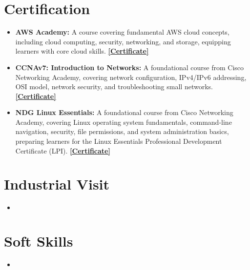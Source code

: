 \documentclass[letterpaper,11pt]{article}
\newcommand{\resumeItem}[1]{
  \item\small{
	{#1 \vspace{-2pt}}
  }
}
\newcommand{\resumeItemListStart}{\begin{itemize}}
\newcommand{\resumeItemListEnd}{\end{itemize}\vspace{-5pt}}
\begin{document}
\section{Certification}
 \begin{itemize}[leftmargin=0.15in, label={}]
            \resumeItemListStart
            \resumeItem{\textbf{AWS Academy: }A course covering fundamental AWS cloud concepts, including cloud computing, security, networking, and storage, equipping learners with core cloud skills. \href{https://drive.google.com/file/d/1iq0E8CPSki_hJY7ClYT2_6qWJkMkrkgf/view?usp=sharing}{\textbf{[Certificate]}}}
            \resumeItem{\textbf{CCNAv7: Introduction to Networks: }A foundational course from Cisco Networking Academy, covering network configuration, IPv4/IPv6 addressing, OSI model, network security, and troubleshooting small networks. \href{https://drive.google.com/file/d/1_IEyxBQWN65uI_czhONt5LY9QOETupq1/view?usp=sharing}{\textbf{[Certificate]}}}
            \resumeItem{\textbf{NDG Linux Essentials: }A foundational course from Cisco Networking Academy, covering Linux operating system fundamentals, command-line navigation, security, file permissions, and system administration basics, preparing learners for the Linux Essentials Professional Development Certificate (LPI). \href{https://drive.google.com/file/d/1K7rsGVzupwHV1LGXMnYStDb6bkIqka6a/view?usp=sharing}{\textbf{[Certificate]}}}
            \resumeItemListEnd
 \end{itemize}
\section{Industrial Visit}
 \begin{itemize}[leftmargin=0.15in, label={}]
	\resumeItemListStart
            \resumeItem{\textbf{EinfoChip }- Ahmedabad}
    	\resumeItem{\textbf{Antier }- Chandigarh}
  	\resumeItemListEnd
            \resumeItem{}
 \end{itemize}

\section{Soft Skills}
\begin{itemize}[leftmargin=0.15in, label={}]
	\resumeItemListStart
            \resumeItem{Leadership \& Team Management}
    	\resumeItem{Problem-Solving \& Critical Thinking}
            \resumeItem{Adaptability \& Quick Learning}
            \resumeItem{Project Management}
  	\resumeItemListEnd
            \resumeItem{}
\end{itemize}
\end{document}
